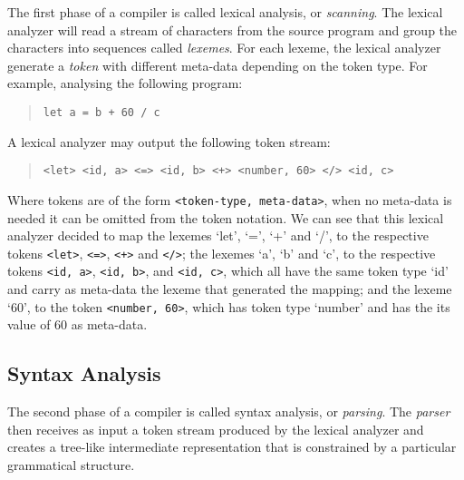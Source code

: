 \documentclass[english, lmodern, oneside, nopageanchorhack]{ufsc-thesis-rn46-2019}
\begin{document}
The first phase of a compiler is called lexical analysis, or \textit{scanning}.
The lexical analyzer will read a stream of characters from the source program and group the characters into sequences called \textit{lexemes}.
For each lexeme, the lexical analyzer generate a \textit{token} with different meta-data depending on the token type.
For example, analysing the following program:
\begin{quote}
\begin{verbatim}
let a = b + 60 / c
\end{verbatim}
\end{quote}
A lexical analyzer may output the following token stream:
\begin{quote}\label{figure:introduction_token_stream}
\begin{verbatim}
<let> <id, a> <=> <id, b> <+> <number, 60> </> <id, c>
\end{verbatim}
\end{quote}
Where tokens are of the form \verb+<token-type, meta-data>+, when no meta-data is needed it can be omitted from the token notation.
We can see that this lexical analyzer decided to map the lexemes `let', `=', `+' and `/', to the respective tokens \verb+<let>+, \verb+<=>+, \verb-<+>- and \verb+</>+;
the lexemes `a', `b' and `c', to the respective tokens \verb+<id, a>+, \verb+<id, b>+, and \verb+<id, c>+, which all have the same token type `id' and carry as meta-data the lexeme that generated the mapping; and the lexeme `60', to the token \verb+<number, 60>+, which has token type `number' and has the its value of $60$ as meta-data.
\subsection{Syntax Analysis}

The second phase of a compiler is called syntax analysis, or \textit{parsing}.
The \textit{parser} then receives as input a token stream produced by the lexical analyzer and creates a tree-like intermediate representation that is constrained by a particular grammatical structure.

\end{document}
